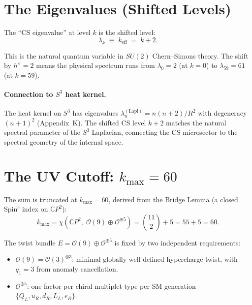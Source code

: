 \documentclass[12pt,a4paper]{article}
\begin{document}
\section{The Eigenvalues (Shifted Levels)}
\label{sec:eigenvalues}

The ``CS eigenvalue'' at level $k$ is the shifted level:
\begin{equation}
\label{eq:eigenvalue}
\lambda_k \;\equiv\; k_{\mathrm{eff}} \;=\; k + 2.
\end{equation}

This is the natural quantum variable in $SU(2)$ Chern--Simons theory.
The shift by $h^\vee = 2$ means the physical spectrum runs from
$\lambda_0 = 2$ (at $k = 0$) to $\lambda_{59} = 61$ (at $k = 59$).

\paragraph{Connection to $S^3$ heat kernel.}
The heat kernel on $S^3$ has eigenvalues $\lambda_n^{(\mathrm{Lapl})}
= n(n+2)/R^2$ with degeneracy $(n+1)^2$ (Appendix~K).
The shifted CS level $k+2$ matches the natural spectral parameter of the
$S^3$ Laplacian, connecting the CS microsector to the spectral geometry
of the internal space.

\section{The UV Cutoff: $k_{\max} = 60$}
\label{sec:cutoff}

The sum is truncated at $k_{\max} = 60$, derived from the Bridge Lemma
(a closed Spin$^c$ index on $\mathbb{C}P^2$):
\begin{equation}
\label{eq:kmax}
k_{\max} = \chi\!\left(\mathbb{C}P^2,\;\mathcal{O}(9) \oplus
\mathcal{O}^{\oplus 5}\right)
= \binom{11}{2} + 5 = 55 + 5 = 60.
\end{equation}

The twist bundle $E = \mathcal{O}(9) \oplus \mathcal{O}^{\oplus 5}$ is
fixed by two independent requirements:
\begin{itemize}
\item $\mathcal{O}(9) = \mathcal{O}(3)^{\otimes 3}$: minimal globally
  well-defined hypercharge twist, with $q_1 = 3$ from anomaly cancellation.
\item $\mathcal{O}^{\oplus 5}$: one factor per chiral multiplet type per SM
  generation $\{Q_L, u_R, d_R, L_L, e_R\}$.
\end{itemize}
\end{document}
